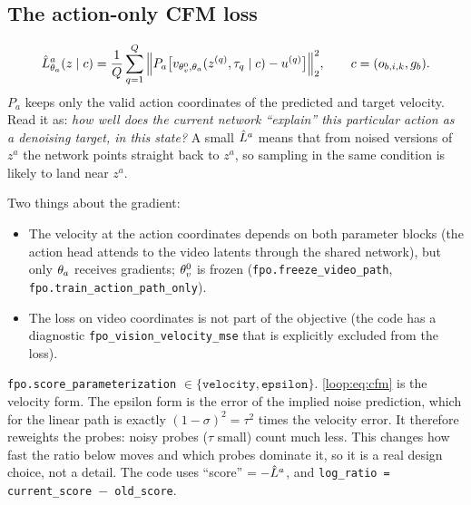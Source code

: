 \subsection{The action-only CFM loss }
\begin{equation}
\hat L^{a}_{\theta_a}(z\mid c)=\frac1Q\sum_{q=1}^{Q}\Big\|P_a\big[v_{\theta_v^{0},\theta_a}(z^{(q)},\tau_q\mid c)-u^{(q)}\big]\Big\|_2^2,\qquad c=(o_{b,i,k},g_b).
\label{loop:eq:cfm}
\end{equation}
$P_a$ keeps only the valid action coordinates of the predicted and target velocity. Read it as: \emph{how well does the current network ``explain'' this particular action as a denoising target, in this state?} A small $\hat L^{a}$ means that from noised versions of $z^a$ the network points straight back to $z^a$, so sampling in the same condition is likely to land near $z^a$.

Two things about the gradient:
\begin{itemize}
\item The velocity at the action coordinates depends on both parameter blocks (the action head attends to the video latents through the shared network), but only $\theta_a$ receives gradients; $\theta_v^{0}$ is frozen (\texttt{fpo.freeze\_video\_path}, \texttt{fpo.train\_action\_path\_only}).
\item The loss on video coordinates is not part of the objective (the code has a diagnostic \texttt{fpo\_vision\_velocity\_mse} that is explicitly excluded from the loss).
\end{itemize}

\begin{codenote}
\texttt{fpo.score\_parameterization} $\in\{\texttt{velocity},\texttt{epsilon}\}$. \eqref{loop:eq:cfm} is the velocity form. The epsilon form is the error of the implied noise prediction, which for the linear path is exactly $(1-\sigma)^2=\tau^2$ times the velocity error. It therefore reweights the probes: noisy probes ($\tau$ small) count much less. This changes how fast the ratio below moves and which probes dominate it, so it is a real design choice, not a detail. The code uses ``score'' $=-\hat L^{a}$, and \texttt{log\_ratio = current\_score $-$ old\_score}.
\end{codenote}

